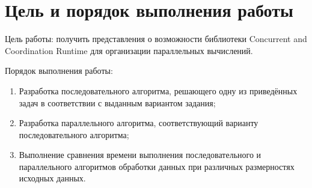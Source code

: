 \documentclass[russian,utf8,pointsection]{eskdtext}
\begin{document}
	\maketitle
	\tableofcontents
	\newpage
	
	\section{Цель и порядок выполнения работы}
		  Цель работы: получить представления о возможности библиотеки Concurrent and Coordination Runtime для организации параллельных вычислений.
	
	Порядок выполнения работы:
	\begin{enumerate}
		\item Разработка последовательного алгоритма, решающего одну из приведённых задач в соответствии с выданным вариантом задания;
		\item Разработка параллельного алгоритма, соответствующий варианту последовательного алгоритма;
		\item Выполнение сравнения времени выполнения последовательного и параллельного алгоритмов обработки данных при различных размерностях исходных данных.
	\end{enumerate}
	\newpage 
	
	
	
\end{document}
